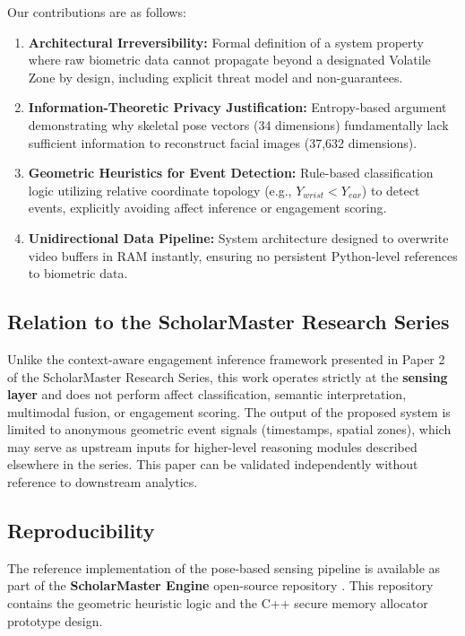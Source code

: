 \documentclass[conference]{IEEEtran}
\begin{document}
Our contributions are as follows:
\begin{enumerate}
    \item \textbf{Architectural Irreversibility:} Formal definition of a system property where raw biometric data cannot propagate beyond a designated Volatile Zone by design, including explicit threat model and non-guarantees.
    \item \textbf{Information-Theoretic Privacy Justification:} Entropy-based argument demonstrating why skeletal pose vectors (34 dimensions) fundamentally lack sufficient information to reconstruct facial images (37,632 dimensions).
    \item \textbf{Geometric Heuristics for Event Detection:} Rule-based classification logic utilizing relative coordinate topology (e.g., $Y_{wrist} < Y_{ear}$) to detect events, explicitly avoiding affect inference or engagement scoring.
    \item \textbf{Unidirectional Data Pipeline:} System architecture designed to overwrite video buffers in RAM instantly, ensuring no persistent Python-level references to biometric data.
\end{enumerate}

\subsection{Relation to the ScholarMaster Research Series}
Unlike the context-aware engagement inference framework presented in Paper 2 of the ScholarMaster Research Series, this work operates strictly at the \textbf{sensing layer} and does not perform affect classification, semantic interpretation, multimodal fusion, or engagement scoring. The output of the proposed system is limited to anonymous geometric event signals (timestamps, spatial zones), which may serve as upstream inputs for higher-level reasoning modules described elsewhere in the series. This paper can be validated independently without reference to downstream analytics.

\subsection{Reproducibility}
The reference implementation of the pose-based sensing pipeline is available as part of the \textbf{ScholarMaster Engine} open-source repository \cite{scholarmaster_repo}. This repository contains the geometric heuristic logic and the C++ secure memory allocator prototype design.

\end{document}
